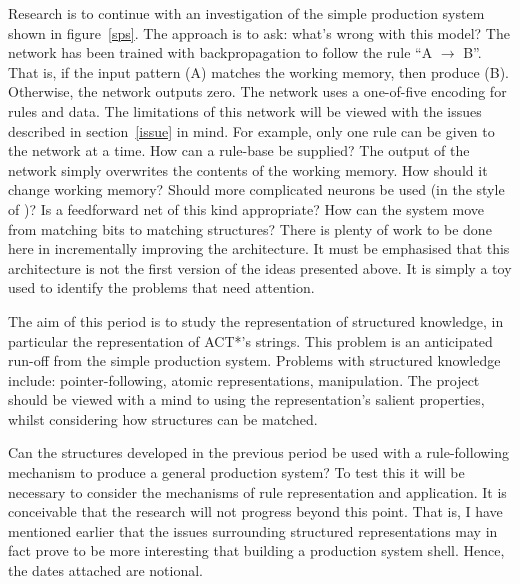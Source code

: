 Research is to continue with an investigation of the simple production
system shown in figure~\ref{sps}. The approach is to ask: what's wrong
with this model? The network has been trained with backpropagation to
follow the rule ``A $\rightarrow$ B''.  That is, if the input pattern
(A) matches the working memory, then produce (B). Otherwise, the
network outputs zero.  The network uses a one-of-five encoding for
rules and data. The limitations of this network will be viewed with
the issues described in section~\ref{issue} in mind.  For example,
only one rule can be given to the network at a time. How can a
rule-base be supplied?  The output of the network simply overwrites
the contents of the working memory.  How should it change working
memory? Should more complicated neurons be used (in the style of
)? Is a feedforward net of this kind appropriate?
How can the system move from matching bits to matching
structures?\label{bits} There is plenty of work to be done here in
incrementally improving the architecture. It must be emphasised that
this architecture is not the first version of the ideas
presented above.  It is simply a toy used to identify the problems
that need attention.


The aim of this period is to study the representation of structured
knowledge, in particular the representation of ACT*'s strings. This
problem is an anticipated run-off from the simple production system.
Problems with structured knowledge include: pointer-following, atomic
representations, manipulation.  The project
should be viewed with a mind
to using the representation's salient properties, whilst considering
how structures can be matched.


Can the structures developed in the previous period be used
with a rule-following mechanism to produce a general
production system?  To test this it will be necessary
to consider the mechanisms of rule representation and application.
It is conceivable that the research will not progress beyond
this point.  That is, I have mentioned earlier that the issues
surrounding structured representations may in fact prove to
be more interesting that building a production system
shell. Hence, the dates attached are notional.


